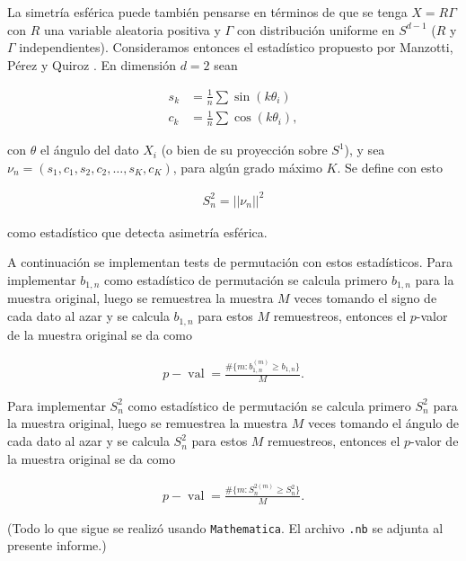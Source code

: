 \documentclass[letter]{article}
\begin{document}
La simetría esférica puede también pensarse en términos de que se tenga $X = R\Gamma$ con $R$ una variable aleatoria positiva y $\Gamma$ con distribución uniforme en $S^{d-1}$ ($R$ y $\Gamma$ independientes). Consideramos entonces el estadístico propuesto por Manzotti, Pérez y Quiroz \cite{Manzotti2002ASymmetry}. En dimensión $d = 2$ sean

\begin{align*}
    s_k &= \frac{1}{n}\sum\sin(k\theta_i)\\
    c_k &= \frac{1}{n}\sum\cos(k\theta_i),
\end{align*}

con $\theta$ el ángulo del dato $X_i$ (o bien de su proyección sobre $S^1$), y sea $\nu_n = (s_1, c_1, s_2, c_2,\dots, s_K, c_K)$, para algún grado máximo $K$. Se define con esto

\begin{align*}
    S^2_n = ||\nu_n||^2
\end{align*}

como estadístico que detecta asimetría esférica.

A continuación se implementan tests de permutación con estos estadísticos. Para implementar $b_{1,n}$ como estadístico de permutación se calcula primero $b_{1,n}$ para la muestra original, luego se remuestrea la muestra $M$ veces tomando el signo de cada dato al azar y se calcula $b_{1,n}$ para estos $M$ remuestreos, entonces el $p$-valor de la muestra original se da como

\begin{align*}
    p-\operatorname{val} = \frac{\#\{m : b_{1,n}^{(m)} \geq b_{1,n}\}}{M}.
\end{align*}

Para implementar $S^2_n$ como estadístico de permutación se calcula primero $S^2_n$ para la muestra original, luego se remuestrea la muestra $M$ veces tomando el ángulo de cada dato al azar y se calcula $S^2_n$ para estos $M$ remuestreos, entonces el $p$-valor de la muestra original se da como

\begin{align*}
    p-\operatorname{val} = \frac{\#\{m : S^{2(m)}_n \geq S^2_n\}}{M}.
\end{align*}

(Todo lo que sigue se realizó usando \texttt{Mathematica}. El archivo \texttt{.nb} se adjunta al presente informe.)
\end{document}
